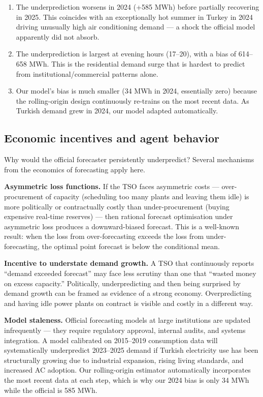 \documentclass[11pt,a4paper]{article}
\begin{document}
\begin{enumerate}
\item The underprediction worsens in 2024 (+585 MWh) before
  partially recovering in 2025. This coincides with an exceptionally
  hot summer in Turkey in 2024 driving unusually high air conditioning
  demand --- a shock the official model apparently did not absorb.

\item The underprediction is largest at evening hours (17--20),
  with a bias of 614--658 MWh. This is the residential demand surge
  that is hardest to predict from institutional/commercial patterns alone.

\item Our model's bias is much smaller (34 MWh in 2024, essentially
  zero) because the rolling-origin design continuously re-trains on the
  most recent data. As Turkish demand grew in 2024, our model adapted
  automatically.
\end{enumerate}

\subsection{Economic incentives and agent behavior}

Why would the official forecaster persistently underpredict?
Several mechanisms from the economics of forecasting apply here.

\textbf{Asymmetric loss functions.}
If the TSO faces asymmetric costs --- over-procurement of capacity
(scheduling too many plants and leaving them idle) is more politically
or contractually costly than under-procurement (buying expensive
real-time reserves) --- then rational forecast optimisation under
asymmetric loss produces a downward-biased forecast. This is a
well-known result: when the loss from over-forecasting exceeds the
loss from under-forecasting, the optimal point forecast is below the
conditional mean.

\textbf{Incentive to understate demand growth.}
A TSO that continuously reports ``demand exceeded forecast'' may face
less scrutiny than one that ``wasted money on excess capacity.''
Politically, underpredicting and then being surprised by demand
growth can be framed as evidence of a strong economy. Overpredicting
and having idle power plants on contract is visible and costly in a
different way.

\textbf{Model staleness.}
Official forecasting models at large institutions are updated
infrequently --- they require regulatory approval, internal audits,
and systems integration. A model calibrated on 2015--2019 consumption
data will systematically underpredict 2023--2025 demand if Turkish
electricity use has been structurally growing due to industrial
expansion, rising living standards, and increased AC adoption.
Our rolling-origin estimator automatically incorporates the most
recent data at each step, which is why our 2024 bias is only 34 MWh
while the official is 585 MWh.
\end{document}
